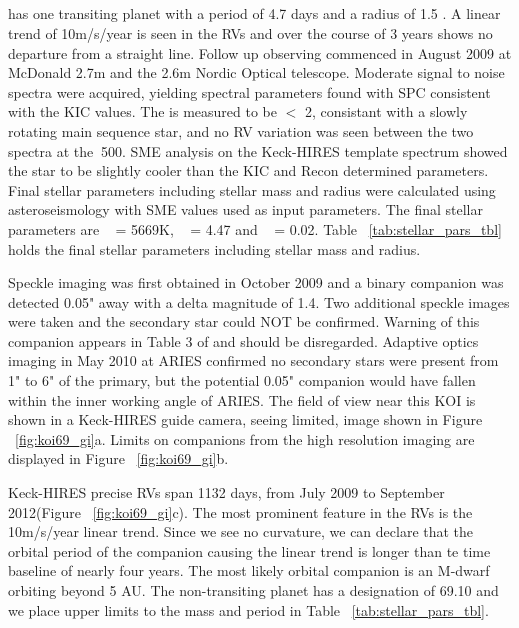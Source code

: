\documentclass{emulateapj}
\begin{document}
\subsection{\koisixnine}  %
{\koisixnine} has one transiting planet with a period of 4.7 days 
and a radius of 1.5 \rearthe.  A linear trend of 10m/s/year is seen 
in the RVs and over the course of 3 years shows no departure 
from a straight line. Follow up observing commenced in August 2009
at McDonald 2.7m and the 2.6m Nordic Optical telescope.
Moderate signal to noise spectra were acquired, yielding 
spectral parameters found with SPC consistent with the KIC values. The 
 \vsini  is measured to be $<$ 2\kms, consistant with a slowly rotating main sequence star,
 and no RV variation was seen between the two spectra  at the $~$500\ms.
SME analysis on the Keck-HIRES template spectrum showed the star to be slightly cooler
than the KIC and Recon determined parameters.  Final stellar parameters
 including stellar mass and radius were calculated using asteroseismology
 with SME values used as input parameters. The final stellar parameters are
 \teff~ = 5669K, \logg~ = 4.47 and \feh~ = 0.02.   Table ~\ref{tab:stellar_pars_tbl} 
 holds the final stellar parameters including stellar mass and radius.
 
 Speckle imaging was first obtained in October 2009 and a binary companion 
 was detected 0.05" away with a delta magnitude of 
 1.4. Two additional speckle images were taken and the secondary
 star could  NOT be confirmed.  Warning of this companion appears in 
Table 3 of \cite{Borucki2011} and should be disregarded.  Adaptive optics imaging in May 2010
at ARIES confirmed no secondary stars were present from 
1" to 6" of the primary, but the potential 0.05" companion would have
fallen within the inner working angle of ARIES.  The field of view near this KOI
is shown in a Keck-HIRES guide camera, seeing limited, image  shown in 
Figure  ~\ref{fig:koi69_gi}a. Limits on companions from the high resolution
imaging are displayed in  Figure  ~\ref{fig:koi69_gi}b.

Keck-HIRES precise RVs span 1132 days, from July 2009 
to September 2012(Figure ~\ref{fig:koi69_gi}c). The most 
prominent feature in the RVs is the 10m/s/year linear trend.  
Since we see no curvature, we can declare that the orbital 
period of the companion causing the linear trend is longer 
than te time baseline of nearly four years. The most likely orbital companion is an 
M-dwarf orbiting beyond 5 AU.  The non-transiting planet has a designation of 69.10
and we place upper limits to the mass and period in Table ~\ref{tab:stellar_pars_tbl}. 
\end{document}
